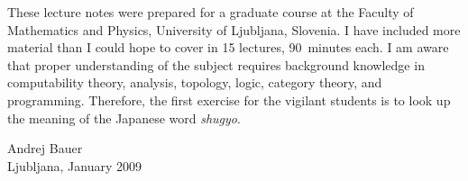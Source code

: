 \documentclass[11pt,a4paper,twoside]{book}
\newcommand{\clearemptydoublepage}{\newpage{\pagestyle{empty}\cleardoublepage}}
\begin{document}
These lecture notes were prepared for a graduate course at the Faculty
of Mathematics and Physics, University of Ljubljana, Slovenia. I have
included more material than I could hope to cover in 15 lectures,
90~minutes each. I am aware that proper understanding of the subject
requires background knowledge in computability theory, analysis,
topology, logic, category theory, and programming. Therefore, the
first exercise for the vigilant students is to look up the meaning of
the Japanese word \emph{shugyo}.


\bigskip

\begin{flushright}
Andrej Bauer\\
Ljubljana, January 2009
\end{flushright}



\clearemptydoublepage

{
\renewcommand{\markboth}[2]{}
\tableofcontents
}







\clearemptydoublepage



{
\renewcommand{\markboth}[2]{}

}




\end{document}
